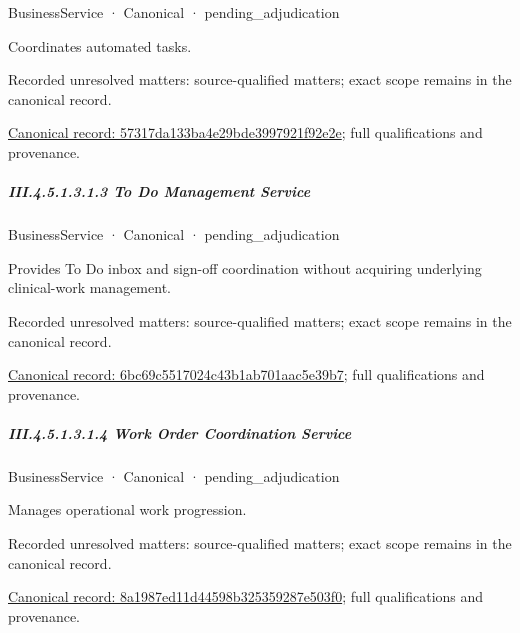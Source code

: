\label{element:57317da133ba4e29bde3997921f92e2e}
{\small BusinessService · Canonical · pending\_adjudication}\par

Coordinates automated tasks.


{\small Recorded unresolved matters: source-qualified matters; exact scope remains in the canonical record.}\par
{\footnotesize \href{../../../../continuum/business/business-service/57317da133ba4e29bde3997921f92e2e.md}{Canonical record: 57317da133ba4e29bde3997921f92e2e}; full qualifications and provenance.}\par
\subparagraph*{III.4.5.1.3.1.3 To Do Management Service}
\label{navigation:III.4.5.1.3.1.3}

\label{element:6bc69c5517024c43b1ab701aac5e39b7}
{\small BusinessService · Canonical · pending\_adjudication}\par

Provides To Do inbox and sign-off coordination without acquiring underlying clinical-work management.


{\small Recorded unresolved matters: source-qualified matters; exact scope remains in the canonical record.}\par
{\footnotesize \href{../../../../continuum/business/business-service/6bc69c5517024c43b1ab701aac5e39b7.md}{Canonical record: 6bc69c5517024c43b1ab701aac5e39b7}; full qualifications and provenance.}\par
\subparagraph*{III.4.5.1.3.1.4 Work Order Coordination Service}
\label{navigation:III.4.5.1.3.1.4}

\label{element:8a1987ed11d44598b325359287e503f0}
{\small BusinessService · Canonical · pending\_adjudication}\par

Manages operational work progression.


{\small Recorded unresolved matters: source-qualified matters; exact scope remains in the canonical record.}\par
{\footnotesize \href{../../../../continuum/business/business-service/8a1987ed11d44598b325359287e503f0.md}{Canonical record: 8a1987ed11d44598b325359287e503f0}; full qualifications and provenance.}\par
